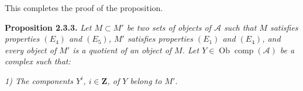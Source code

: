 This completes the proof of the proposition.

\medskip\noindent\textbf{Proposition 2.3.3.}
\textit{Let $M\subset M'$ be two sets of objects of $\mathcal A$ such that
$M$ satisfies properties $(E_4)$ and $(E_5)$, $M'$ satisfies properties
$(E_1)$ and $(E_4)$, and every object of $M'$ is a quotient of an object of
$M$. Let $Y\in\operatorname{Ob}\operatorname{comp}(\mathcal A)$ be a complex
such that:}

\noindent\textit{1) The components $Y^i$, $i\in\mathbf Z$, of $Y$ belong to
$M'$.}
\endgroup
